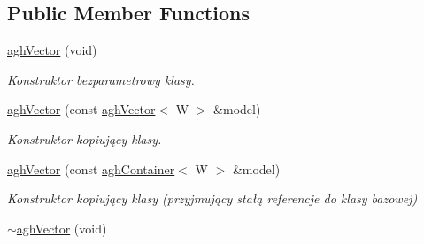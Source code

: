 \subsection*{\-Public \-Member \-Functions}
\begin{DoxyCompactItemize}
\item 
\hypertarget{classaghVector_a763d69f140dbda3ba37fb521c087bebb}{\hyperlink{classaghVector_a763d69f140dbda3ba37fb521c087bebb}{agh\-Vector} (void)}\label{classaghVector_a763d69f140dbda3ba37fb521c087bebb}

\begin{DoxyCompactList}\small\item\em \-Konstruktor bezparametrowy klasy. \end{DoxyCompactList}\item 
\hyperlink{classaghVector_ad225209b71a22d1dc5e06a34c4c3b4c4}{agh\-Vector} (const \hyperlink{classaghVector}{agh\-Vector}$<$ \-W $>$ \&model)
\begin{DoxyCompactList}\small\item\em \-Konstruktor kopiujący klasy. \end{DoxyCompactList}\item 
\hyperlink{classaghVector_a9356f34d3b079c882ae7a194e64e2e1d}{agh\-Vector} (const \hyperlink{classaghContainer}{agh\-Container}$<$ \-W $>$ \&model)
\begin{DoxyCompactList}\small\item\em \-Konstruktor kopiujący klasy (przyjmujący stałą referencje do klasy bazowej) \end{DoxyCompactList}\item 
\hypertarget{classaghVector_a317cd9c266f5cd1902f6edf471255d4d}{\hyperlink{classaghVector_a317cd9c266f5cd1902f6edf471255d4d}{$\sim$agh\-Vector} (void)}\label{classaghVector_a317cd9c266f5cd1902f6edf471255d4d}


\end{DoxyCompactItemize}

